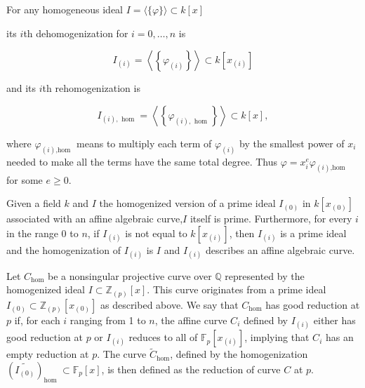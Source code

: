 \begin{definition}
    For any homogeneous ideal $
I=\langle\{\varphi\}\rangle \subset k[x]
$

its $i$th dehomogenization for $i=0, \ldots, n$ is

$$
I_{(i)}=\left\langle\left\{\varphi_{(i)}\right\}\right\rangle \subset k\left[x_{(i)}\right]
$$

and its $i$th rehomogenization is

$$
I_{(i), \text { hom }}=\left\langle\left\{\varphi_{(i), \text { hom }}\right\}\right\rangle \subset k[x],
$$

where $\varphi_{(i) \text {,hom }}$ means to multiply each term of $\varphi_{(i)}$ by the smallest power of $x_{i}$ needed to make all the terms have the same total degree. Thus $\varphi=x_{i}^{e} \varphi_{(i) \text {,hom }}$ for some $e \geq 0$.
\end{definition} 



\begin{lemma}
Given a field \( k \) and \( I \) the homogenized version of a prime ideal \( I_{(0)} \) in \( k\left[x_{(0)}\right] \) associated with an affine algebraic curve,\( I \) itself is prime. Furthermore, for every \( i \) in the range \( 0 \) to \( n \), if \( I_{(i)} \) is not equal to \( k\left[x_{(i)}\right] \), then \( I_{(i)} \) is a prime ideal and the homogenization of \( I_{(i)} \) is \( I \) and \( I_{(i)} \) describes an affine algebraic curve.
\end{lemma}

\begin{definition}
Let \( C_{\mathrm{hom}} \) be a nonsingular projective curve over \( \mathbb{Q} \) represented by the homogenized ideal \( I \subset \mathbb{Z}_{(p)}[x] \). This curve originates from a prime ideal \( I_{(0)} \subset \mathbb{Z}_{(p)}\left[x_{(0)}\right] \) as described above. We say that \( C_{\mathrm{hom}} \) has good reduction at \( p \) if, for each \( i \) ranging from 1 to \( n \), the affine curve \( C_{i} \) defined by \( I_{(i)} \) either has good reduction at \( p \) or \( I_{(i)} \) reduces to all of \( \mathbb{F}_{p}\left[x_{(i)}\right] \), implying that \( C_{i} \) has an empty reduction at \( p \). The curve \( \widetilde{C}_{\mathrm{hom}} \), defined by the homogenization \( \left(\widetilde{I_{(0)}}\right)_{\text {hom }} \subset \mathbb{F}_{p}[x] \), is then defined as the reduction of curve \( C \) at \( p \).
\end{definition}

